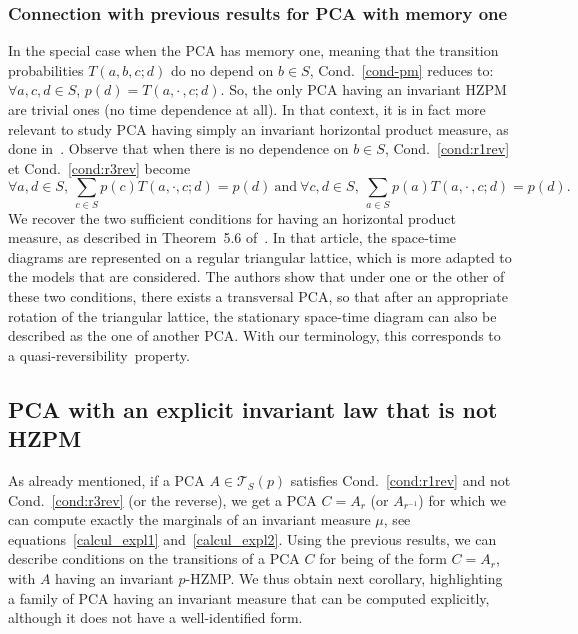 \documentclass[10pt]{amsart}
\theoremstyle{definition}\newtheorem{defi}[theo]{Definition}\newtheorem{rema}[theo]{Remark}\newtheorem{exam}[theo]{Example}\newtheorem{exem}[theo]{Example}\newtheorem{nota}[theo]{Notation}
\newcounter{a}
\newcommand{\Cond}{Cond.}
\newcommand{\triang}[2]{\mathcal{T}_{#1} \left(#2 \right)}
\let\oldforall\forall
\renewcommand*{\forall}{\mathrel{\oldforall}}
\begin{document}
\subsubsection*{Connection with previous results for PCA with memory one}
In the special case when the PCA has memory one, meaning that the transition probabilities $T(a,b,c;d)$ do no depend on $b\in S$, \Cond~\ref{cond-pm} reduces to: $\forall a,c,d\in S$, $p(d)=T(a,\cdot\,, c ; d).$ So, the only PCA having an invariant HZPM are trivial ones (no time dependence at all). In that context, it is in fact more relevant to study PCA having simply an invariant horizontal product measure, as done in~\cite{mm_ihp}. Observe that when there is no dependence on $b\in S$, \Cond~\ref{cond:r1rev} et \Cond~\ref{cond:r3rev} become
\[
\forall a,d \in S,\ \sum_{c \in S} p(c) T(a,\cdot,c;d) = p(d) \ \text{and} \ \forall c,d \in S,\ \sum_{a \in S} p(a) T(a,\cdot\,,c;d) = p(d).
\]
We recover the two sufficient conditions for having an horizontal product measure, as described in Theorem~5.6 of~\cite{mm_ihp}. In that article, the space-time diagrams are represented on a regular triangular lattice, which is more adapted to the models that are considered. The authors show that under one or the other of these two conditions, there exists a transversal PCA, so that after an appropriate rotation of the triangular lattice, the stationary space-time diagram can also be described as the one of another PCA. With our terminology, this corresponds to a quasi-reversibility~property.

\subsection{PCA with an explicit invariant law that is not HZPM}\label{notHZPM}

As already mentioned, if a PCA $A \in \triang{S}{p}$ satisfies \Cond~\ref{cond:r1rev} and not \Cond~\ref{cond:r3rev} (or the reverse), we get a PCA $C=A_r$ (or $A_{r^{-1}}$) for which we can compute exactly the marginals of an invariant measure $\mu$, see equations~\eqref{calcul_expl1} and~\eqref{calcul_expl2}. Using the previous results, we can describe conditions on the transitions of a PCA $C$ for being of the form $C=A_r$, with $A$ having an invariant $p$-HZMP. We thus obtain next corollary, highlighting a family of PCA having an invariant measure that can be computed explicitly, although it does not have a well-identified form.
\end{document}
